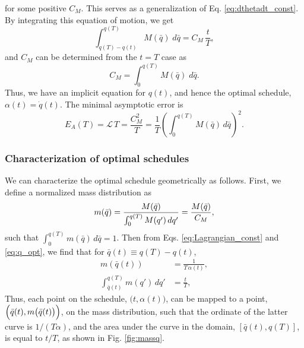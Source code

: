 \documentclass[reprint, superscriptaddress, floatfix]{revtex4-1}
\newcommand{\Err}{E}
\begin{document}
%
for some positive $C_M$.
%
This serves as a generalization of Eq. \eqref{eq:dthetadt_const}.
%
By integrating this equation of motion, we get
%
\begin{equation}
  \int_{ q(T) - q(t) }^{ q(T) }
    M(\bar q)
    \;
    d \bar q
  =
  C_M \, \frac t T
  ,
  \label{eq:q_opt}
\end{equation}
%
and $C_M$ can be determined from
the $t = T$ case as
%
\begin{equation}
  C_M =
  \int_{ 0 }^{ q(T) }
    M( \bar q )
    \;
    d \bar q
  .
  \label{eq:mint}
\end{equation}
%
Thus, we have an implicit equation for $q(t)$,
and hence the optimal schedule,
$\alpha(t) = \dot q(t)$.
%
The minimal asymptotic error is
%
\begin{equation}
  \Err_A(T)
  =
  \mathcal L \, T
  =
  \frac { C_M^2 } { T }
  =
  \frac 1 T
  \left(
    \int_0^{ q(T) } M(\bar q) \, d \bar q
  \right)^2
  .
\label{eq:error_asym2}
\end{equation}



\subsubsection{\label{sec:mass_distr}
Characterization of optimal schedules}



We can characterize the optimal schedule
geometrically as follows.
%
First, we define
a normalized mass distribution as
%
\begin{equation}
  m(\bar q)
  =
  \frac{
    M(\bar q)
  }
  {
    \int_0^{ q(T) } M(q') \, d q'
  }
  =
  \frac{
    M(\bar q)
  }
  {
    C_M
  }
  ,
\notag
\end{equation}
%
such that
$\int_0^{q(T)} m(\bar q) \, d\bar q = 1$.
%
Then from Eqs. \eqref{eq:Lagrangian_const} and \eqref{eq:q_opt},
we find that for $\bar q(t) \equiv q(T) - q(t)$,
%
\begin{align}
  m\left( \bar q(t) \right)
  &=
  \frac{ 1 }
       { T \, \alpha(t) }
  ,
  \label{eq:mQ_invTa}
  \\
  \int_{\bar q(t)}^{ q(T) }
    m(q') \, d q'
  &=
  \frac t T
  ,
  \label{eq:intmQ_tT}
\end{align}
%
Thus, each point on the schedule,
$\bigl(t, \alpha(t)\bigr)$,
can be mapped to a point,
$\Bigl(\bar q(t), m\bigl(\bar q(t)\bigr)\Bigr)$,
on the mass distribution,
such that the ordinate of the latter curve
is $1/(T\alpha)$,
and the area under the curve in the domain, $[\bar q(t), q(T)]$,
is equal to $t/T$,
as shown in Fig. \ref{fig:massq}.
\end{document}
